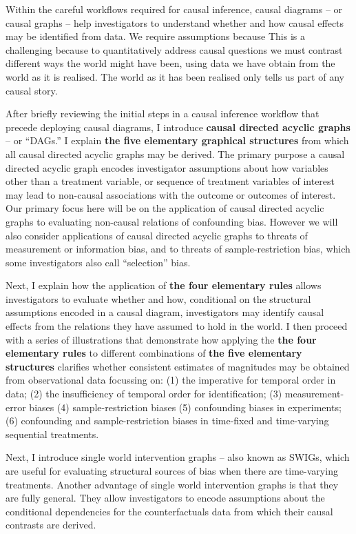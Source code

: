 \documentclass[
  single column]{article}
\begin{document}
Within the careful workflows required for causal inference, causal
diagrams -- or causal graphs -- help investigators to understand whether
and how causal effects may be identified from data. We require
assumptions because This is a challenging because to quantitatively
address causal questions we must contrast different ways the world might
have been, using data we have obtain from the world as it is realised.
The world as it has been realised only tells us part of any causal
story.

After briefly reviewing the initial steps in a causal inference workflow
that precede deploying causal diagrams, I introduce \textbf{causal
directed acyclic graphs} -- or ``DAGs.'' I explain \textbf{the five
elementary graphical structures} from which all causal directed acyclic
graphs may be derived. The primary purpose a causal directed acyclic
graph encodes investigator assumptions about how variables other than a
treatment variable, or sequence of treatment variables of interest may
lead to non-causal associations with the outcome or outcomes of
interest. Our primary focus here will be on the application of causal
directed acyclic graphs to evaluating non-causal relations of
confounding bias. However we will also consider applications of causal
directed acyclic graphs to threats of measurement or information bias,
and to threats of sample-restriction bias, which some investigators also
call ``selection'' bias.

Next, I explain how the application of \textbf{the four elementary
rules} allows investigators to evaluate whether and how, conditional on
the structural assumptions encoded in a causal diagram, investigators
may identify causal effects from the relations they have assumed to hold
in the world. I then proceed with a series of illustrations that
demonstrate how applying the \textbf{the four elementary rules} to
different combinations of \textbf{the five elementary structures}
clarifies whether consistent estimates of magnitudes may be obtained
from observational data focussing on: (1) the imperative for temporal
order in data; (2) the insufficiency of temporal order for
identification; (3) measurement-error biases (4) sample-restriction
biases (5) confounding biases in experiments; (6) confounding and
sample-restriction biases in time-fixed and time-varying sequential
treatments.

Next, I introduce single world intervention graphs -- also known as
SWIGs, which are useful for evaluating structural sources of bias when
there are time-varying treatments. Another advantage of single world
intervention graphs is that they are fully general. They allow
investigators to encode assumptions about the conditional dependencies
for the counterfactuals data from which their causal contrasts are
derived.
\end{document}
